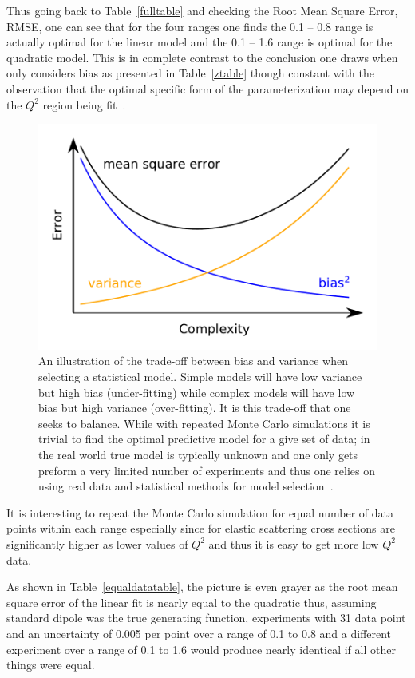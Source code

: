 \documentclass[10pt,aps,prc,twocolumn]{revtex4-1}
\begin{document}
Thus going back to Table~\ref{fulltable} and checking the Root Mean Square Error, RMSE, one can see that for the four ranges
one finds the 0.1 -- 0.8 range is actually optimal for the linear model and the 0.1 -- 1.6 range is optimal for the quadratic model. 
This is in complete contrast to the conclusion one draws when only considers bias as presented in Table~\ref{ztable}
though constant with the observation that the optimal specific form of the parameterization may depend on the $Q^2$ region
being fit~\cite{Alberico:2008sz}.
\begin{figure}
\includegraphics[width=\columnwidth]{Figure/biasvariance-clean.pdf}
\caption{An illustration of the trade-off between bias and variance when selecting a statistical model.   Simple models
will have low variance but high bias (under-fitting) while complex models will have low bias but high variance (over-fitting).   
It is this trade-off that one seeks to balance.   While with repeated  Monte Carlo simulations it is trivial to find the optimal
predictive model for a give set of data; in the real world true model is typically unknown and one only gets preform a very limited number
of experiments and thus one relies on using real data and statistical methods for model selection~\cite{Hastie:2009}.
}
\end{figure}

It is interesting to repeat the Monte Carlo simulation for equal number of data points within each range
especially since for elastic scattering cross sections are significantly higher as lower values of $Q^2$
and thus it is easy to get more low $Q^2$ data.

As shown in Table~\ref{equaldatatable}, the picture is even grayer as the root mean square error of the linear 
fit is nearly equal to the quadratic thus, assuming standard dipole was the true generating function,  experiments
with 31 data point and an uncertainty of 0.005 per point over a range of 0.1 to 0.8 and a different experiment
over a range of 0.1 to 1.6 would produce nearly identical if all other things were equal.
\end{document}
